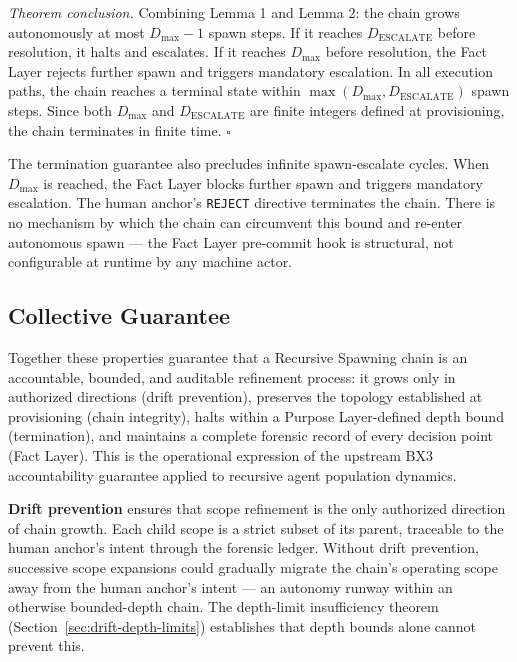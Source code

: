 \medskip
\textit{Theorem conclusion.} Combining Lemma 1 and Lemma 2: the chain grows autonomously at most $D_{\mathrm{max}} - 1$ spawn steps. If it reaches $D_{\mathrm{ESCALATE}}$ before resolution, it halts and escalates. If it reaches $D_{\mathrm{max}}$ before resolution, the Fact Layer rejects further spawn and triggers mandatory escalation. In all execution paths, the chain reaches a terminal state within $\max(D_{\mathrm{max}}, D_{\mathrm{ESCALATE}})$ spawn steps. Since both $D_{\mathrm{max}}$ and $D_{\mathrm{ESCALATE}}$ are finite integers defined at provisioning, the chain terminates in finite time. $\square$

\medskip
The termination guarantee also precludes infinite spawn-escalate cycles. When $D_{\mathrm{max}}$ is reached, the Fact Layer blocks further spawn and triggers mandatory escalation. The human anchor's \texttt{REJECT} directive terminates the chain. There is no mechanism by which the chain can circumvent this bound and re-enter autonomous spawn — the Fact Layer pre-commit hook is structural, not configurable at runtime by any machine actor.

\subsection{Collective Guarantee}
\label{sec:rs-collective-guarantee}

Together these properties guarantee that a Recursive Spawning chain is an accountable, bounded, and auditable refinement process: it grows only in authorized directions (drift prevention), preserves the topology established at provisioning (chain integrity), halts within a Purpose Layer-defined depth bound (termination), and maintains a complete forensic record of every decision point (Fact Layer). This is the operational expression of the upstream BX3 accountability guarantee applied to recursive agent population dynamics.

\medskip
\textbf{Drift prevention} ensures that scope refinement is the only authorized direction of chain growth. Each child scope is a strict subset of its parent, traceable to the human anchor's intent through the forensic ledger. Without drift prevention, successive scope expansions could gradually migrate the chain's operating scope away from the human anchor's intent — an autonomy runway within an otherwise bounded-depth chain. The depth-limit insufficiency theorem (Section~\ref{sec:drift-depth-limits}) establishes that depth bounds alone cannot prevent this.


